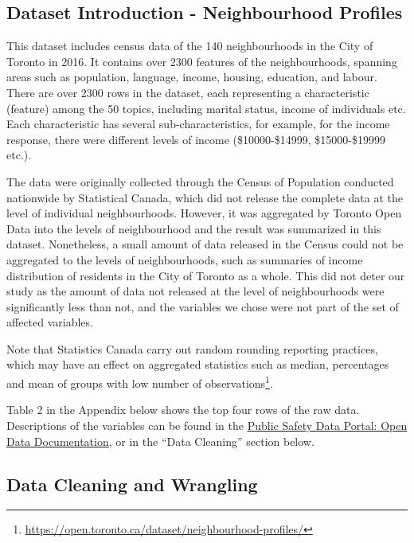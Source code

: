 \documentclass[
]{article}
\begin{document}
\hypertarget{dataset-introduction---neighbourhood-profiles}{%
\subsection{Dataset Introduction - Neighbourhood
Profiles}\label{dataset-introduction---neighbourhood-profiles}}

This dataset includes census data of the 140 neighbourhoods in the City
of Toronto in 2016. It contains over 2300 features of the
neighbourhoods, spanning areas such as population, language, income,
housing, education, and labour. There are over 2300 rows in the dataset,
each representing a characteristic (feature) among the 50 topics,
including marital status, income of individuals etc. Each characteristic
has several sub-characteristics, for example, for the income response,
there were different levels of income (\$10000-\$14999, \$15000-\$19999
etc.).

The data were originally collected through the Census of Population
conducted nationwide by Statistical Canada, which did not release the
complete data at the level of individual neighbourhoods. However, it was
aggregated by Toronto Open Data into the levels of neighbourhood and the
result was summarized in this dataset. Nonetheless, a small amount of
data released in the Census could not be aggregated to the levels of
neighbourhoods, such as summaries of income distribution of residents in
the City of Toronto as a whole. This did not deter our study as the
amount of data not released at the level of neighbourhoods were
significantly less than not, and the variables we chose were not part of
the set of affected variables.

Note that Statistics Canada carry out random rounding reporting
practices, which may have an effect on aggregated statistics such as
median, percentages and mean of groups with low number of
observations\footnote{\url{https://open.toronto.ca/dataset/neighbourhood-profiles/}}.

Table 2 in the Appendix below shows the top four rows of the raw data.
Descriptions of the variables can be found in the
\href{https://torontops.maps.arcgis.com/sharing/rest/content/items/c0b17f1888544078bf650f3b8b04d35d/data}{Public
Safety Data Portal: Open Data Documentation}, or in the ``Data
Cleaning'' section below.

\hypertarget{data-cleaning-and-wrangling}{%
\subsection{Data Cleaning and
Wrangling}\label{data-cleaning-and-wrangling}}
\end{document}
